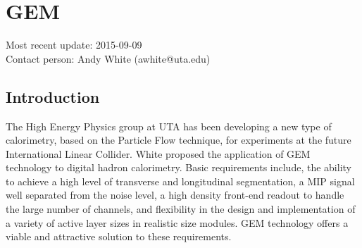 \section{GEM}
Most recent update: 2015-09-09 \\
Contact person: Andy White (awhite@uta.edu)
\subsection{Introduction}
The High Energy Physics group at UTA has been developing a new type of calorimetry, based on the Particle Flow technique, for experiments at the future International Linear Collider. White proposed the application of GEM~\cite{Sauli1997531} technology to digital hadron calorimetry. Basic requirements include, the ability to achieve a high level of transverse and longitudinal segmentation, a MIP signal well separated from the noise level, a high density front-end readout to handle the large number of channels, and flexibility in the design and implementation of a variety of active layer sizes in realistic size modules. GEM technology offers a viable and attractive solution to these requirements.
